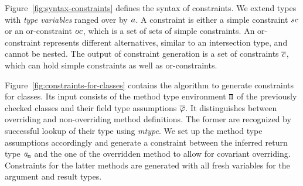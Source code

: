 \documentclass[a4paper,USenglish,cleveref, autoref, thm-restate]{lipics-v2021}
\begin{document}
Figure~\ref{fig:syntax-constraints} defines the syntax of
constraints. We extend types with \emph{type variables} ranged over by
$\mathit{ a }$. A constraint is either a simple constraint $sc$ or
an or-constraint $oc$, which is a set of sets of simple
constraints. An or-constraint represents different alternatives,
similar to an intersection type, and
cannot be nested. The output of constraint generation is a set of
constraints $\overline{\mathit{c}}$, which can hold simple constraints as well as or-constraints.






Figure~\ref{fig:constraints-for-classes} contains the algorithm
{\fjtype} to generate constraints for classes. Its input
consists of the method type environment ${\tt \Pi}$ of the previously
checked classes and their field type assumptions
$\overline{\tt \mathtt{\varphi}{}}$. It distinguishes between overriding and
non-overriding method definitions. The former are recognized by
successful lookup of their type using \textit{mtype}. We set up the
method type assumptions accordingly and generate a constraint between
the inferred return type $\mathit{ a }_{{\tt m}}$ and the one of the
overridden method to allow for covariant overriding.
Constraints for the latter methods are generated with all fresh
variables for the argument and result types.
\end{document}
